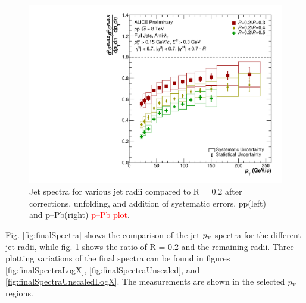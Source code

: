 \documentclass[ALICE]{ALICE_analysis_notes}
\newcommand{\pT}{$p_{\mbox{\tiny T}}$\xspace}
\newcommand{\pPb}{{\mbox{p--Pb}}\xspace}
\newcommand{\pp}{pp\xspace}
\begin{document}
\begin{figure}
    \centering
    \includegraphics[width=15cm]{figures/FinalResults/Bayes_reg6_Ratio.pdf}
    \caption{Jet spectra for various jet radii compared to R = 0.2 after corrections, unfolding, and addition of systematic errors. \pp (left) and \pPb (right) \textcolor{red}{\pPb plot}.}
    \label{fig:finalSpectraRatios}
\end{figure}

Fig. \ref{fig:finalSpectra} shows the comparison of the jet \pT spectra for the different jet radii, while fig. \ref{fig:finalSpectraRatios} shows the ratio of R = 0.2 and the remaining radii. Three plotting variations of the final spectra can be found in figures \ref{fig:finalSpectraLogX}, \ref{fig:finalSpectraUnscaled}, and \ref{fig:finalSpectraUnscaledLogX}.
The measurements are shown in the selected \pT regions.
\end{document}
